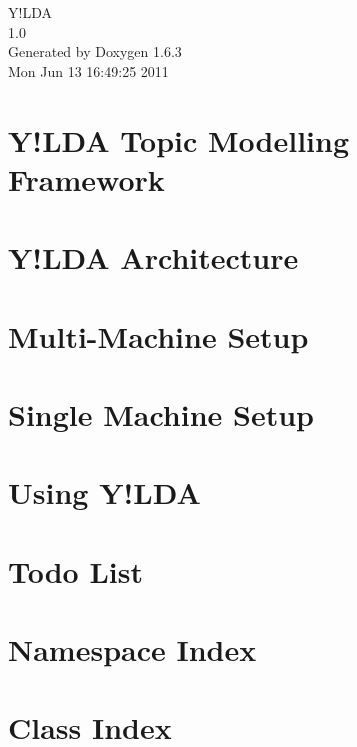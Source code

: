 \documentclass[letterpaper]{book}
\begin{document}
\hypersetup{pageanchor=false}
\begin{titlepage}
\vspace*{7cm}
\begin{center}
{\Large Y!LDA \\[1ex]\large 1.0 }\\
\vspace*{1cm}
{\large Generated by Doxygen 1.6.3}\\
\vspace*{0.5cm}
{\small Mon Jun 13 16:49:25 2011}\\
\end{center}
\end{titlepage}
\clearemptydoublepage
{}
\tableofcontents
\clearemptydoublepage
{}
\hypersetup{pageanchor=true}
\chapter{Y!LDA Topic Modelling Framework}
\label{index}\hypertarget{index}{}
\chapter{Y!LDA Architecture}
\label{architecture}
\hypertarget{architecture}{}

\chapter{Multi-\/Machine Setup}
\label{multi_machine_usage}
\hypertarget{multi_machine_usage}{}

\chapter{Single Machine Setup}
\label{single_machine_usage}
\hypertarget{single_machine_usage}{}

\chapter{Using Y!LDA}
\label{usage}
\hypertarget{usage}{}

\chapter{Todo List}
\label{todo}
\hypertarget{todo}{}

\chapter{Namespace Index}

\chapter{Class Index}

\end{document}
